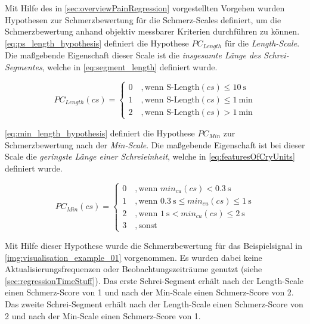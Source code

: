 Mit Hilfe des in \autoref{sec:overviewPainRegression} vorgestellten Vorgehen wurden Hypothesen zur Schmerzbewertung für die Schmerz-Scales definiert, um die Schmerzbewertung anhand objektiv messbarer Kriterien durchführen zu können. \autoref{eq:ps_length_hypothesis} definiert die Hypothese $PC_{Length}$ für die \emph{Length-Scale}. Die maßgebende Eigenschaft dieser Scale ist die \emph{insgesamte Länge des Schrei-Segmentes}, welche in \autoref{eq:segment_length} definiert wurde.

\begin{equation}
PC_{Length}(cs) = \begin{cases}
 0 \quad ,  \text{wenn } \text{S-Length}(cs) \leq \SI{10}{\second} \\
 1 \quad ,  \text{wenn } \text{S-Length}(cs) \leq \SI{1}{\minute} \\
 2 \quad ,  \text{wenn } \text{S-Length}(cs) > \SI{1}{\minute}
 \end{cases}	
 \label{eq:ps_length_hypothesis}
\end{equation}

\autoref{eq:min_length_hypothesis} definiert die Hypothese $PC_{Min}$ zur Schmerzbewertung nach der \emph{Min-Scale}. Die maßgebende Eigenschaft ist bei dieser Scale die \emph{geringste Länge einer Schreieinheit}, welche in \autoref{eq:featuresOfCryUnits} definiert wurde.

\begin{equation}
PC_{Min}(cs) = \begin{cases}
 0 \quad ,  \text{wenn } min_{cu}(cs) < \SI{0.3}{\second}\\
 1 \quad ,  \text{wenn } \SI{0.3}{\second} \leq min_{cu}(cs) \leq \SI{1}{\second}\\
 2 \quad ,  \text{wenn } \SI{1}{\second} < min_{cu}(cs) \leq \SI{2}{\second} \\
 3 \quad , \text{sonst }
 \end{cases}	
 \label{eq:min_length_hypothesis}
\end{equation}

Mit Hilfe dieser Hypothese wurde die Schmerzbewertung für das Beispielsignal in \autoref{img:visualisation_example_01} vorgenommen. Es wurden dabei keine Aktualisierungsfrequenzen oder Beobachtungszeiträume genutzt (siehe \autoref{sec:regressionTimeStuff}). Das erste Schrei-Segment erhält nach der Length-Scale einen Schmerz-Score von 1 und nach der Min-Scale einen Schmerz-Score von 2. Das zweite Schrei-Segment erhält nach der Length-Scale einen Schmerz-Score von 2 und nach der Min-Scale einen Schmerz-Score von 1.

